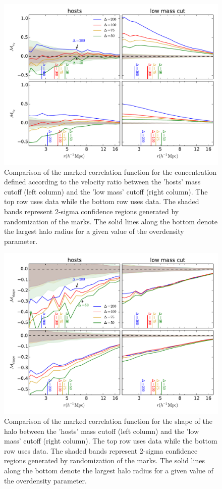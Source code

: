 \documentclass[usenatbib,usegraphicx,letterpaper]{mn2e}
\begin{document}
\begin{figure}
	\centering
	\includegraphics[width=\textwidth]{all_mcf_cV_z00_hostsvlow.pdf}
	\caption{Comparison of the marked correlation function for the concentration defined according to the velocity ratio between the 'hosts' mass cutoff (left column) and the 'low mass' cutoff (right column). The top row uses \simA data while the bottom row uses \simB data. The shaded bands represent 2-sigma confidence regions generated by randomization of the marks. The solid lines along the bottom denote the largest halo radius for a given value of the overdensity parameter.}
	\label{fig:hvl_mcf_cV}
\end{figure}

\begin{figure}
	\centering
	\includegraphics[width=\textwidth]{all_mcf_s_z00_hostsvlow.pdf}
	\caption{Comparison of the marked correlation function for the shape of the halo between the 'hosts' mass cutoff (left column) and the 'low mass' cutoff (right column). The top row uses \simA data while the bottom row uses \simB data. The shaded bands represent 2-sigma confidence regions generated by randomization of the marks. The solid lines along the bottom denote the largest halo radius for a given value of the overdensity parameter.}
	\label{fig:hvl_mcf_s}
\end{figure}
\end{document}

